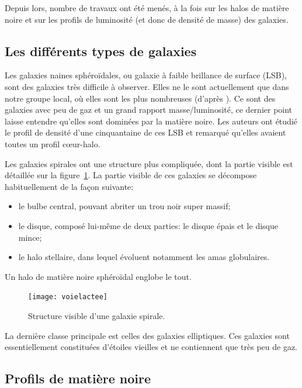 			Depuis lors, nombre de travaux ont été menés, à la fois sur les halos de
			matière noire et sur les profils de luminosité (et donc de densité de masse)
			des galaxies.

		\subsection{Les différents types de galaxies}

			Les galaxies naines sphéroïdales, ou galaxie à faible brillance de surface (LSB), sont des
			galaxies très difficile à observer. Elles ne le sont actuellement que dans notre groupe local,
			où elles sont les plus nombreuses (d'après \citet{2013MNRAS.429.3068T}). Ce sont des galaxies
			avec peu de gaz et un grand rapport masse/luminosité, ce dernier point laisse entendre qu'elles
			sont dominées par la matière noire. Les auteurs \cite{2001ApJ...552L..23D} ont étudié le profil
			de densité d'une cinquantaine de ces LSB et remarqué qu'elles avaient toutes un profil cœur-halo.

			Les galaxies spirales ont une structure plus compliquée, dont la partie visible est détaillée sur la
			figure~\ref{Fig::Intro::schemaGS}.
			La partie visible de ces galaxies se décompose  habituellement de la façon suivante:
			\begin{itemize}
				\item le bulbe central, pouvant abriter un trou noir super massif;
				\item le disque, composé lui-même de deux parties: le disque épais
					et le disque mince;
				\item le halo stellaire, dans lequel évoluent notamment les amas globulaires.
			\end{itemize}
			Un halo de matière noire sphéroïdal englobe le tout.

			\begin{figure}[h]
				\begin{center}
					\texttt{[image: voielactee]}
				\end{center}
				\caption{Structure visible d'une galaxie spirale.\label{Fig::Intro::schemaGS}}
			\end{figure}

			La dernière classe principale est celles des galaxies elliptiques. Ces galaxies sont essentiellement
			constituées d'étoiles vieilles et ne contiennent que très
			peu de gaz.

		\subsection{Profils de matière noire}

